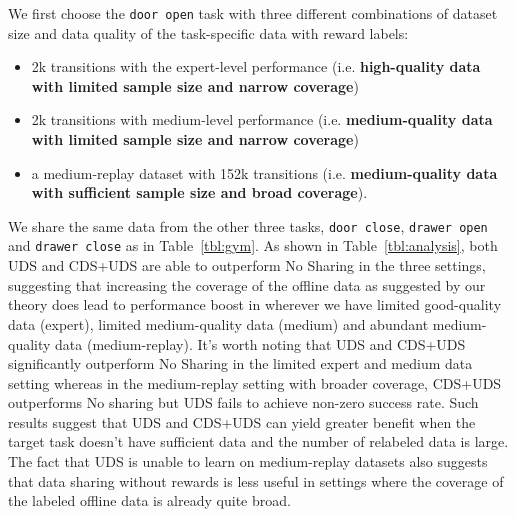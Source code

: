 {We first choose the \texttt{door open} task with three different combinations of dataset size and data quality of the task-specific data with reward labels:
\begin{itemize}
    \item 2k transitions with the expert-level performance (i.e. \textbf{high-quality data with limited sample size and narrow coverage})
    \item 2k transitions with medium-level performance (i.e. \textbf{medium-quality data with limited sample size and narrow coverage})
    \item a medium-replay dataset with 152k transitions (i.e. \textbf{medium-quality data with sufficient sample size and broad coverage}).
\end{itemize}
 We share the same data from the other three tasks, \texttt{door close}, \texttt{drawer open} and \texttt{drawer close} as in Table~\ref{tbl:gym}. As shown in Table~\ref{tbl:analysis}, both UDS and CDS+UDS are able to outperform No Sharing in the three settings, suggesting that increasing the coverage of the offline data as suggested by our theory does lead to performance boost in wherever we have limited good-quality data (expert), limited medium-quality data (medium) and abundant medium-quality data (medium-replay). It’s worth noting that UDS and CDS+UDS significantly outperform No Sharing in the limited expert and medium data setting whereas in the medium-replay setting with broader coverage, CDS+UDS outperforms No sharing but UDS fails to achieve non-zero success rate. Such results suggest that UDS and CDS+UDS can yield greater benefit when the target task doesn’t have sufficient data and the number of relabeled data is large. The fact that UDS is unable to learn on medium-replay datasets also suggests that data sharing without rewards is less useful in settings where the coverage of the labeled offline data is already quite broad.}

\subsection{}
\label{app:unlabeled_dataset_size_analysis}

